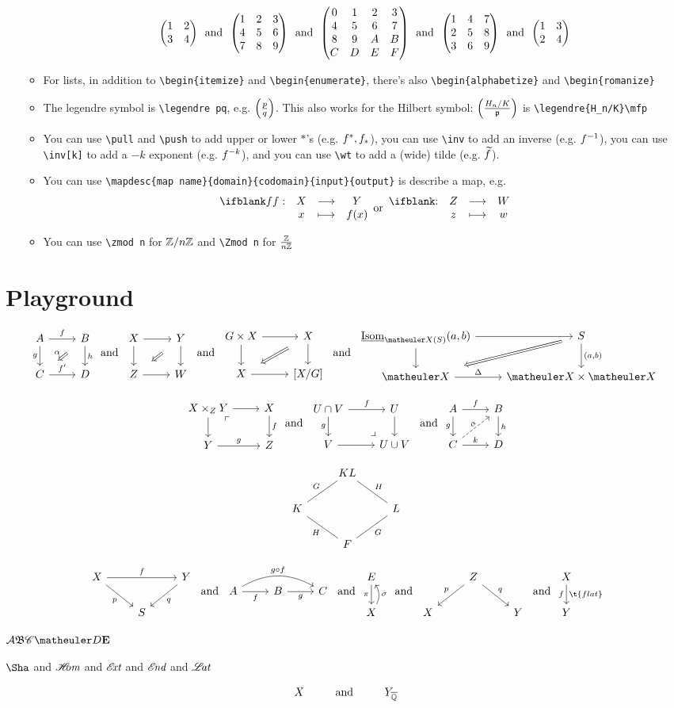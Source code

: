\documentclass{article}
\numberwithin{thm}{section}
\numberwithin{prob}{section}
\numberwithin{equation}{section}
\begin{document}
\begin{itemize}
\begin{itemize}
        $$\mat1234\tand\Mat123456789\tand\MAT0123456789ABCDEF\tand\Matt123456789\tand\matt1234$$
        \item For lists, in addition to \verb+\begin{itemize}+ and \verb+\begin{enumerate}+, there's also \verb+\begin{alphabetize}+ and \verb+\begin{romanize}+
        \item The legendre symbol is \verb+\legendre pq+, e.g. $\legendre pq$. This also works for the Hilbert symbol: $\legendre{H_n/K}\mfp$ is \verb+\legendre{H_n/K}\mfp+
        \item You can use \verb+\pull+ and \verb+\push+ to add upper or lower $*$'s (e.g. $\pull f,\push f$), you can use \verb+\inv+ to add an inverse (e.g. $\inv f$), you can use \verb+\inv[k]+ to add a $-k$ exponent (e.g. $\inv[k] f$), and you can use \verb+\wt+ to add a (wide) tilde (e.g. $\wt f$).
        \item You can use \verb+\mapdesc{map name}{domain}{codomain}{input}{output}+ is describe a map, e.g.
        $$\mapdesc fXYx{f(x)}\tor\mapdesc{}ZWzw$$
        \item You can use \verb+\zmod n+ for $\zmod n$ and \verb+\Zmod n+ for $\Zmod n$
    \end{itemize}
\end{itemize}

\newpage
\section{Playground}

$$\twocommsquare AfBghC{f'}D\alpha\tand\baretwocommsquare XYZW\tand\baretwocommsquare{G\by X}XX{[X/G]}\tand\twocommsquare{\ul\Isom_{\meX(S)}(a,b)}{}S{}{(a,b)}\meX\Delta{\meX\by\meX}{}$$

$$\pullback {X\by_ZY}XfYgZ\tand\pushout {U\cap V}fUgV{U\cup V}\tand\liftsquare AfBghCkD\alpha$$

$$\galoisdiamond{KL}GHKLHGF$$

$$\mapover XfYpqS\tand\compdiag AfBgC{g\circ f}\tand\mapwithsect E\pi X\sigma\tand\correspondence ZpqXY\tand\mapdown Xf{\t{flat}}Y$$

$\mcA\mf B\msC\meD\mbf E$

$\Sha$ and $\sHom$ and $\sExt$ and $\sEnd$ and $\sLat$

$$X\Text{and}\sspacing Y_\Qbar$$
\end{document}
